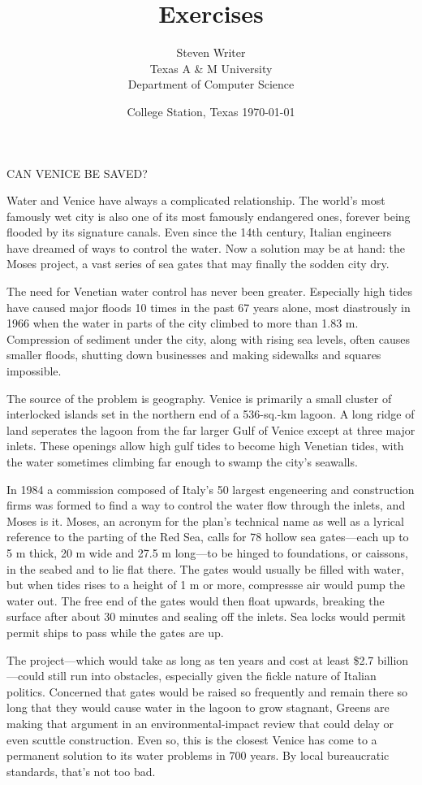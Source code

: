 \documentclass[titlepage]{article}
\begin{document}
\title{Exercises} \author{Steven Writer\\Texas A \& M University\\
Department of Computer Science}
\date{College Station, Texas \today} \maketitle
CAN VENICE BE SAVED?

Water and Venice have always a complicated relationship. 
The world's most famously wet city is also one of its most
famously endangered ones, forever being flooded by its
signature canals. Even since the 14th century, Italian
engineers have dreamed of ways to control the water. Now
a solution may be at hand: the Moses project, a vast series
of sea gates that may finally the sodden city dry.

The need for Venetian water control has never been greater.
Especially high tides have caused major floods 10 times in
the past 67 years alone, most diastrously in 1966 when the
water in parts of the city climbed to more than 1.83 m.
Compression of sediment under the city, along with rising sea
levels, often causes smaller floods, shutting down businesses
and making sidewalks and squares impossible.

The source of the problem is geography. Venice is primarily a
small cluster of interlocked islands set in the northern end of
a 536-sq.-km lagoon. A long ridge of land seperates the lagoon
from the far larger Gulf of Venice except at three major inlets.
These openings allow high gulf tides to become high Venetian tides,
with the water sometimes climbing far enough to swamp the city's
seawalls.

In 1984 a commission composed of Italy's 50 largest engeneering and
construction firms was formed to find a way to control the water
flow through the inlets, and Moses is it. Moses, an acronym for the
plan's technical name as well as a lyrical reference to the parting of
the Red Sea, calls for 78 hollow sea gates---each up to 5 m thick, 20 m
wide and 27.5 m long---to be hinged to foundations, or caissons, in the
seabed and to lie flat there. The gates would usually be filled with
water, but when tides rises to a height of 1 m or more, compressse air
would pump the water out. The free end of the gates would then float
upwards, breaking the surface after about 30 minutes and sealing off 
the inlets. Sea locks would permit permit ships to pass while the gates
are up.

The project---which would take as long as ten years and cost at least
\$2.7 billion---could still run into obstacles, especially given the
fickle nature of Italian politics. Concerned that gates would be raised
so frequently and remain there so long that they would cause water in the
lagoon to grow stagnant, Greens are making that argument in an
environmental-impact review that could delay or even scuttle construction.
Even so, this is the closest Venice has come to a permanent solution to 
its water problems in 700 years. By local bureaucratic standards, that's
not too bad.
\end{document}

